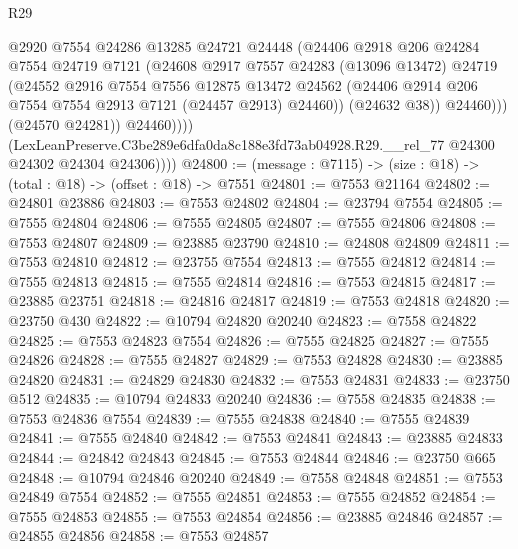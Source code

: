 \begin{lexlean}{R29}
\begin{coremodule}
                        @2920
                        @7554
                        @24286
                        @13285
                        @24721
                        @24448
                        (@24406
                          @2918
                          @206
                          @24284
                          @7554
                          @24719
                          @7121
                          (@24608
                            @2917
                            @7557
                            @24283
                            (@13096 @13472)
                            @24719
                            (@24552
                              @2916
                              @7554
                              @7556
                              @12875
                              @13472
                              @24562
                              (@24406 @2914 @206 @7554 @7554 @2913 @7121 (@24457 @2913) @24460))
                            (@24632 @38))
                          @24460)))
                    (@24570 @24281))
                  @24460))))
          (LexLeanPreserve.C3be289e6dfa0da8c188e3fd73ab04928.R29.__rel_77
            @24300
            @24302
            @24304
            @24306))))
@24800 := (message : @7115) -> (size : @18) -> (total : @18) -> (offset : @18) -> @7551
@24801 := @7553 @21164
@24802 := @24801 @23886
@24803 := @7553 @24802
@24804 := @23794 @7554
@24805 := @7555 @24804
@24806 := @7555 @24805
@24807 := @7555 @24806
@24808 := @7553 @24807
@24809 := @23885 @23790
@24810 := @24808 @24809
@24811 := @7553 @24810
@24812 := @23755 @7554
@24813 := @7555 @24812
@24814 := @7555 @24813
@24815 := @7555 @24814
@24816 := @7553 @24815
@24817 := @23885 @23751
@24818 := @24816 @24817
@24819 := @7553 @24818
@24820 := @23750 @430
@24822 := @10794 @24820 @20240
@24823 := @7558 @24822
@24825 := @7553 @24823 @7554
@24826 := @7555 @24825
@24827 := @7555 @24826
@24828 := @7555 @24827
@24829 := @7553 @24828
@24830 := @23885 @24820
@24831 := @24829 @24830
@24832 := @7553 @24831
@24833 := @23750 @512
@24835 := @10794 @24833 @20240
@24836 := @7558 @24835
@24838 := @7553 @24836 @7554
@24839 := @7555 @24838
@24840 := @7555 @24839
@24841 := @7555 @24840
@24842 := @7553 @24841
@24843 := @23885 @24833
@24844 := @24842 @24843
@24845 := @7553 @24844
@24846 := @23750 @665
@24848 := @10794 @24846 @20240
@24849 := @7558 @24848
@24851 := @7553 @24849 @7554
@24852 := @7555 @24851
@24853 := @7555 @24852
@24854 := @7555 @24853
@24855 := @7553 @24854
@24856 := @23885 @24846
@24857 := @24855 @24856
@24858 := @7553 @24857

\end{coremodule}
\end{lexlean}
